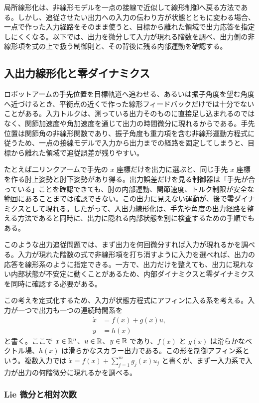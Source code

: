 局所線形化は、非線形モデルを一点の接線で近似して線形制御へ戻る方法である。しかし、追従させたい出力への入力の伝わり方が状態とともに変わる場合、一点で作った入力経路をそのまま使うと、目標から離れた領域で出力応答を指定しにくくなる。以下では、出力を微分して入力が現れる階数を調べ、出力側の非線形項を式の上で扱う制御則と、その背後に残る内部運動を確認する。

\subsection{入出力線形化と零ダイナミクス}

ロボットアームの手先位置を目標軌道へ追わせる、あるいは振子角度を望む角度へ近づけるとき、平衡点の近くで作った線形フィードバックだけでは十分でないことがある。入力トルクは、測っている出力そのものに直接足し込まれるのではなく、関節加速度や角加速度を通じて出力の時間微分に現れるからである。手先位置は関節角の非線形関数であり、振子角度も重力項を含む非線形運動方程式に従うため、一点の接線モデルで入力から出力までの経路を固定してしまうと、目標から離れた領域で追従誤差が残りやすい。

たとえば二リンクアームで手先の $x$ 座標だけを出力に選ぶと、同じ手先 $x$ 座標を作る肘上姿勢と肘下姿勢があり得る。出力誤差だけを見る制御器は「手先が合っている」ことを確認できても、肘の内部運動、関節速度、トルク制限が安全な範囲にあることまでは確認できない。この出力に見えない運動が、後で零ダイナミクスとして現れる。したがって、入出力線形化は、手先や角度の出力経路を整える方法であると同時に、出力に隠れる内部状態を別に検査するための手順でもある。

このような出力追従問題では、まず出力を何回微分すれば入力が現れるかを調べる。入力が現れた階数の式で非線形項を打ち消すように入力を選べれば、出力の応答を線形系のように指定できる。一方で、出力だけを整えても、出力に現れない内部状態が不安定に動くことがあるため、内部ダイナミクスと零ダイナミクスを同時に確認する必要がある。

この考えを定式化するため、入力が状態方程式にアフィンに入る系を考える。入力が一つで出力も一つの連続時間系を
\begin{align}
  \dot{x}&=f(x)+g(x)u,\\
  y&=h(x)
\end{align}
と書く。ここで $x\in\mathbb{R}^n$、$u\in\mathbb{R}$、$y\in\mathbb{R}$ であり、$f(x)$ と $g(x)$ は滑らかなベクトル場、$h(x)$ は滑らかなスカラー出力である。この形を制御アフィン系という。複数入力では $\dot{x}=f(x)+\sum_{j=1}^{m}g_j(x)u_j$ と書くが、まず一入力系で入力が出力の何階微分に現れるかを調べる。

\subsubsection{Lie 微分と相対次数}


